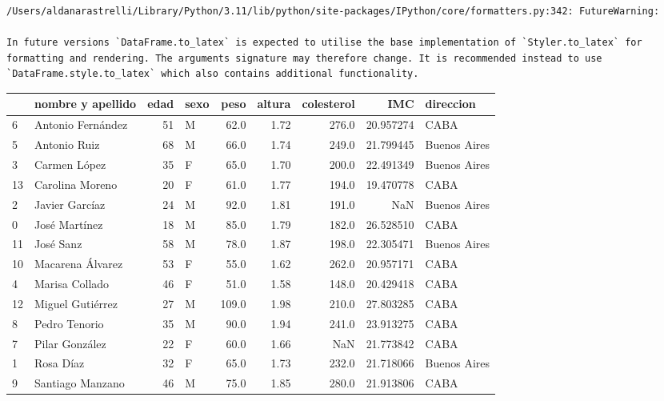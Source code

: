 \documentclass[
  letterpaper,
  DIV=11,
  numbers=noendperiod]{scrreprt}
\begin{document}
\begin{verbatim}
/Users/aldanarastrelli/Library/Python/3.11/lib/python/site-packages/IPython/core/formatters.py:342: FutureWarning:

In future versions `DataFrame.to_latex` is expected to utilise the base implementation of `Styler.to_latex` for formatting and rendering. The arguments signature may therefore change. It is recommended instead to use `DataFrame.style.to_latex` which also contains additional functionality.
\end{verbatim}

\begin{tabular}{llrlrrrrl}
\toprule
{} &  nombre y apellido &  edad & sexo &   peso &  altura &  colesterol &        IMC &     direccion \\
\midrule
6  &  Antonio Fernández &    51 &    M &   62.0 &    1.72 &       276.0 &  20.957274 &          CABA \\
5  &       Antonio Ruiz &    68 &    M &   66.0 &    1.74 &       249.0 &  21.799445 &  Buenos Aires \\
3  &       Carmen López &    35 &    F &   65.0 &    1.70 &       200.0 &  22.491349 &  Buenos Aires \\
13 &    Carolina Moreno &    20 &    F &   61.0 &    1.77 &       194.0 &  19.470778 &          CABA \\
2  &     Javier Garcíaz &    24 &    M &   92.0 &    1.81 &       191.0 &        NaN &  Buenos Aires \\
0  &      José Martínez &    18 &    M &   85.0 &    1.79 &       182.0 &  26.528510 &          CABA \\
11 &          José Sanz &    58 &    M &   78.0 &    1.87 &       198.0 &  22.305471 &  Buenos Aires \\
10 &   Macarena Álvarez &    53 &    F &   55.0 &    1.62 &       262.0 &  20.957171 &          CABA \\
4  &     Marisa Collado &    46 &    F &   51.0 &    1.58 &       148.0 &  20.429418 &          CABA \\
12 &   Miguel Gutiérrez &    27 &    M &  109.0 &    1.98 &       210.0 &  27.803285 &          CABA \\
8  &      Pedro Tenorio &    35 &    M &   90.0 &    1.94 &       241.0 &  23.913275 &          CABA \\
7  &     Pilar González &    22 &    F &   60.0 &    1.66 &         NaN &  21.773842 &          CABA \\
1  &          Rosa Díaz &    32 &    F &   65.0 &    1.73 &       232.0 &  21.718066 &  Buenos Aires \\
9  &   Santiago Manzano &    46 &    M &   75.0 &    1.85 &       280.0 &  21.913806 &          CABA \\
\bottomrule
\end{tabular}
\end{document}
